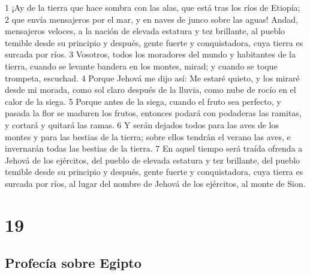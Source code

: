1 ¡Ay de la tierra que hace sombra con las alas, que está tras los ríos de Etiopía; 
2 que envía mensajeros por el mar, y en naves de junco sobre las aguas! Andad, mensajeros veloces, a la nación de elevada estatura y tez brillante, al pueblo temible desde su principio y después, gente fuerte y conquistadora, cuya tierra es surcada por ríos.
3 Vosotros, todos los moradores del mundo y habitantes de la tierra, cuando se levante bandera en los montes, mirad; y cuando se toque trompeta, escuchad.
4 Porque Jehová me dijo así: Me estaré quieto, y los miraré desde mi morada, como sol claro después de la lluvia, como nube de rocío en el calor de la siega.
5 Porque antes de la siega, cuando el fruto sea perfecto, y pasada la flor se maduren los frutos, entonces podará con podaderas las ramitas, y cortará y quitará las ramas.
6 Y serán dejados todos para las aves de los montes y para las bestias de la tierra; sobre ellos tendrán el verano las aves, e invernarán todas las bestias de la tierra.
7 En aquel tiempo será traída ofrenda a Jehová de los ejércitos, del pueblo de elevada estatura y tez brillante, del pueblo temible desde su principio y después, gente fuerte y conquistadora, cuya tierra es surcada por ríos, al lugar del nombre de Jehová de los ejércitos, al monte de Sion.

\chapter{19}

\section*{Profecía sobre Egipto}

